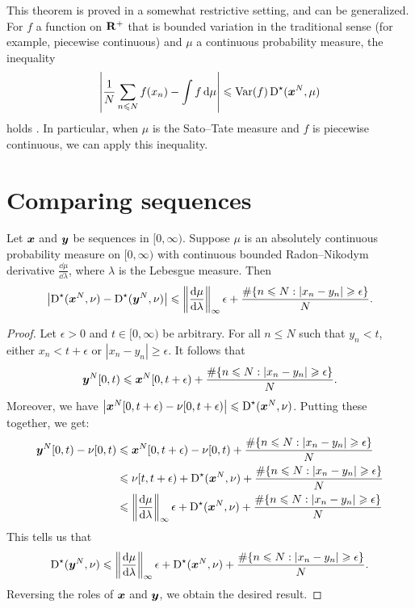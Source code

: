 This theorem is proved in a somewhat restrictive setting, and can be 
generalized. For $f$ a function on $\mathbf{R}^+$ that is bounded variation in 
the traditional sense (for example, piecewise continuous) and $\mu$ a 
continuous probability measure, the inequality 
\[
	\left| \frac{1}{N} \sum_{n\leqslant N} f(x_n) - \int f\, \mathrm{d}\mu\right| \leqslant \operatorname{Var}(f) \operatorname{D}^\star({\boldsymbol x}^N,\mu) 
\]
holds \cite[Ch.~2, Th.~5.1]{kuipers-niederreiter-1974}. In particular, when 
$\mu$ is the Sato--Tate measure and $f$ is piecewise continuous, we can apply 
this inequality. 





\section{Comparing sequences}

\begin{lemma}\label{lem:disc-of-two-seq}
Let ${\boldsymbol x}$ and ${\boldsymbol y}$ be sequences in $[0,\infty)$. Suppose $\mu$ is an 
absolutely continuous probability measure on $[0,\infty)$ with continuous 
bounded Radon--Nikodym derivative $\frac{\dd \mu}{\dd\lambda}$, where 
$\lambda$ is the Lebesgue measure. Then 
\[
	\left|\operatorname{D}^\star({\boldsymbol x}^N, \nu) - \operatorname{D}^\star({\boldsymbol y}^N,\nu)\right| \leqslant \left\|\frac{\mathrm{d}\mu}{\mathrm{d}\lambda}\right\|_\infty \epsilon + \frac{\#\{ n\leqslant N : |x_n - y_n| \geqslant \epsilon\}}{N} .
\]
\end{lemma}
\begin{proof}
Let $\epsilon>0$ and $t\in [0,\infty)$ be arbitrary. For all $n\leqslant N$ 
such that $y_n<t$, either $x_n < t+\epsilon$ or 
$|x_n - y_n| \geqslant \epsilon$. It follows that 
\[
	{\boldsymbol y}^N[0,t) \leqslant {\boldsymbol x}^N[0,t+\epsilon) + \frac{\#\{ n\leqslant N : |x_n - y_n| \geqslant \epsilon\}}{N} .
\]
Moreover, we have 
$\left| {\boldsymbol x}^N[0,t+\epsilon) - \nu[0,t+\epsilon)\right| \leqslant \operatorname{D}^\star({\boldsymbol x}^N,\nu)$. Putting these together, we get: 
\begin{align*}
	{\boldsymbol y}^N[0,t) - \nu[0,t) 
		&\leqslant {\boldsymbol x}^N[0,t+\epsilon) - \nu[0,t) + \frac{\#\{ n\leqslant N : |x_n - y_n| \geqslant \epsilon\}}{N} \\
		&\leqslant \nu[t,t+\epsilon) + \operatorname{D}^\star({\boldsymbol x}^N,\nu) + \frac{\#\{ n\leqslant N : |x_n - y_n| \geqslant \epsilon\}}{N} \\
		&\leqslant \left\|\frac{\mathrm{d}\mu}{\mathrm{d}\lambda}\right\|_\infty \epsilon + \operatorname{D}^\star({\boldsymbol x}^N,\nu) + \frac{\#\{ n\leqslant N : |x_n - y_n| \geqslant \epsilon\}}{N} 
\end{align*}
This tells us that 
\[
	\operatorname{D}^\star({\boldsymbol y}^N,\nu) \leqslant \left\|\frac{\mathrm{d}\mu}{\mathrm{d}\lambda}\right\|_\infty \epsilon + \operatorname{D}^\star({\boldsymbol x}^N,\nu) + \frac{\#\{ n\leqslant N : |x_n - y_n| \geqslant \epsilon\}}{N} .
\]
Reversing the roles of ${\boldsymbol x}$ and ${\boldsymbol y}$, we obtain the desired result. 
\end{proof}

